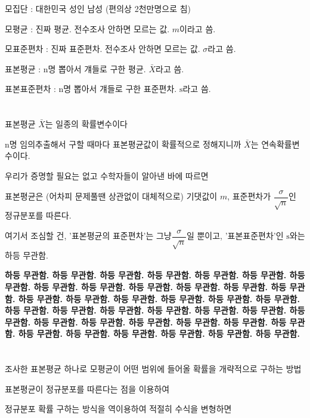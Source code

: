 ﻿\documentclass{oblivoir}
\begin{document}
모집단 : 대한민국 성인 남성 (편의상 2천만명으로 침)\par
모평균 : 진짜 평균. 전수조사 안하면 모르는 값. $m$이라고 씀.\par
모표준편차 : 진짜 표준편차. 전수조사 안하면 모르는 값. $\sigma$라고 씀.\par
\par
표본평균 : n명 뽑아서 걔들로 구한 평균. $\bar{X}$라고 씀.\par
표본표준편차 : n명 뽑아서 걔들로 구한 표준편차. $\mathrm{s}$라고 씀.\par
\par\par

\section{}
표본평균  $\bar{X}$는 일종의 확률변수이다\par
n명 임의추출해서 구할 때마다 표본평균값이 확률적으로 정해지니까 $\bar{X}$는 연속확률변수이다.\par
우리가 증명할 필요는 없고 수학자들이 알아낸 바에 따르면\par
표본평균은 (어차피 문제풀땐 상관없이 대체적으로) 기댓값이 $m$, 표준편차가 $\dfrac{\sigma}{\sqrt{n}}$인 정규분포를 따른다.\par
여기서 조심할 건, '표본평균의 표준편차'는 그냥$\dfrac{\sigma}{\sqrt{n}}$일 뿐이고, '표본표준편차'인 $\mathrm{s}$와는 하등 무관함.\par
\begin{center}
    
\textbf{하등 무관함. 하등 무관함. 하등 무관함. 하등 무관함. 하등 무관함. 하등 무관함. 하등 무관함. 하등 무관함. 하등 무관함. 하등 무관함. 하등 무관함. 하등 무관함. 하등 무관함. 하등 무관함. 하등 무관함. 하등 무관함. 하등 무관함. 하등 무관함. 하등 무관함. 하등 무관함. 하등 무관함. 하등 무관함. 하등 무관함. 하등 무관함. 하등 무관함. 하등 무관함. 하등 무관함. 하등 무관함. 하등 무관함. 하등 무관함. 하등 무관함. 하등 무관함. 하등 무관함. 하등 무관함. 하등 무관함. 하등 무관함. 하등 무관함. 하등 무관함. }

\end{center}
\section{}
조사한 표본평균 하나로 모평균이 어떤 범위에 들어올 확률을 개략적으로 구하는 방법\par
표본평균이 정규분포를 따른다는 점을 이용하여\par
정규분포 확률 구하는 방식을 역이용하여 적절히 수식을 변형하면\par
\end{document}
